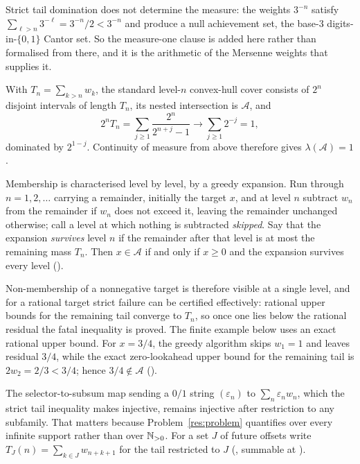 \documentclass[11pt]{article}
\newcommand{\wgt}[1]{w_{#1}}
\newcommand{\Ach}{\mathcal A}
\begin{document}
Strict tail domination does not determine the measure: the weights $3^{-n}$
satisfy $\sum_{\ell>n}3^{-\ell}=3^{-n}/2<3^{-n}$ and produce a null achievement
set, the base-$3$ digits-in-$\{0,1\}$ Cantor set.  So the measure-one clause is
added here rather than formalised from there, and it is the arithmetic of the
Mersenne weights that supplies it.

With $T_n=\sum_{k>n}\wgt k$, the standard
level-$n$ convex-hull cover consists of $2^n$ disjoint intervals of length
$T_n$, its nested intersection is $\Ach$, and
\[
  2^nT_n=\sum_{j\ge1}\frac{2^n}{2^{n+j}-1}\longrightarrow\sum_{j\ge1}2^{-j}=1,
\]
dominated by $2^{1-j}$.  Continuity of measure from above therefore gives
$\lambda(\Ach)=1$.

Membership is characterised level by level, by a greedy expansion.  Run through
$n=1,2,\dots$ carrying a remainder, initially the target $x$, and at level $n$
subtract $\wgt n$ from the remainder if $\wgt n$ does not exceed it, leaving
the remainder unchanged otherwise; call a level at which nothing is subtracted
\emph{skipped}.  Say that the expansion \emph{survives} level $n$ if the
remainder after that level is at most the remaining mass $T_n$.  Then
$x\in\Ach$ if and only if $x\ge0$ and the expansion survives every level
().

Non-membership of a nonnegative target is therefore visible at a single level,
and for a rational target strict failure can be certified effectively:
rational upper bounds for the remaining tail converge to $T_n$, so once one
lies below the rational residual the fatal inequality is proved.  The finite
example below uses an exact rational upper bound.  For
$x=3/4$, the greedy algorithm skips $\wgt1=1$ and leaves residual $3/4$,
while the exact zero-lookahead upper bound for the remaining tail is
$2\wgt2=2/3<3/4$; hence $3/4\notin\Ach$
().

The selector-to-subsum map sending a $0/1$ string $(\varepsilon_n)$ to
$\sum_n\varepsilon_n\wgt n$, which the strict tail inequality makes injective,
remains injective after restriction to any subfamily.  That matters because
Problem~\ref{res:problem} quantifies
over every infinite support rather than over $\mathbb{N}_{>0}$.  For a set $J$ of future
offsets write $T_J(n)=\sum_{k\in J}\wgt{n+k+1}$ for the tail restricted to $J$
(,
summable at
).
\end{document}
